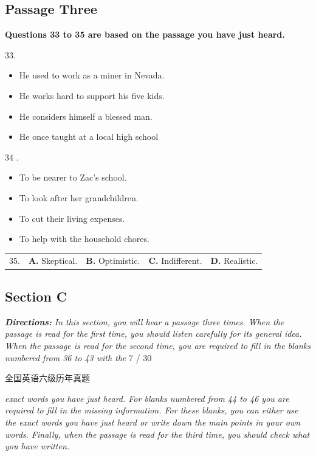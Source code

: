 \documentclass[UTF8,11pt]{ctexart}
\begin{document}
\subsection*{\textbf{Passage Three}}


\textbf{Questions 33 to 35 are based on the passage you have just heard.}


33.


\begin{itemize}[leftmargin=2em,itemsep=.2em,topsep=.4em]\item[A.] He used to work as a miner in Nevada.
\item[B.] He works hard to support his five kids.
\item[C.] He considers himself a blessed man.
\item[D.] He once taught at a local high school
\end{itemize}

34 .


\begin{itemize}[leftmargin=2em,itemsep=.2em,topsep=.4em]\item[A.] To be nearer to Zac's school.
\item[B.] To look after her grandchildren.
\item[C.] To cut their living expenses.
\item[D.] To help with the household chores.
\end{itemize}

\noindent\begin{tabularx}{\linewidth}{@{}lXXXX@{}}35. & \textbf{A.} Skeptical. & \textbf{B.} Optimistic. & \textbf{C.} Indifferent. & \textbf{D.} Realistic.\\\end{tabularx}\par

\subsection*{\textbf{Section C}}


\textbf{\textit{Directions:}}\textit{ In this section, you will hear a passage three times. When the passage is read for the} \textit{first time, you should listen carefully for its general idea. When the passage is read for} \textit{the second time, you are required to fill in the blanks numbered from 36 to 43 with the} 7 / 30


全国英语六级历年真题


\textit{exact words you have just heard. For blanks numbered from 44 to 46 you are required} \textit{to fill in the missing information. For these blanks, you can either use the exact words} \textit{you have just heard or write down the main points in your own words. Finally, when} \textit{the passage is read for the third time, you should check what you have written.}
\end{document}
